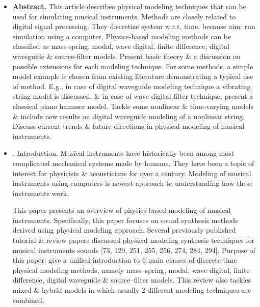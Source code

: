 \documentclass{article}
\begin{document}
\begin{itemize}
	\item {\bf Abstract.} This article describes physical modeling techniques that can be used for simulating musical instruments. Methods are closely related to digital signal processing. They discretize system w.r.t. time, because aim: run simulation using a computer. Physics-based modeling methods can be classified as mass-spring, modal, wave digital, finite difference, digital waveguide \& source-filter models. Present basic theory \& a discussion on possible extensions for each modeling technique. For some methods, a simple model example is chosen from existing literature demonstrating a typical use of method. E.g., in case of digital waveguide modeling technique a vibrating string model is discussed, \& in case of wave digital filter technique, present a classical piano hammer model. Tackle some nonlinear \& time-varying models \& include new results on digital waveguide modeling of a nonlinear string. Discuss current trends \& future directions in physical modeling of musical instruments.
	\item {. Introduction.} Musical instruments have historically been among most complicated mechanical systems made by humans. They have been a topic of interest for physicists \& acousticians for over a century. Modeling of musical instruments using computers is newest approach to understanding how these instruments work.
	
	This paper presents an overview of physics-based modeling of musical instruments. Specifically, this paper focuses on sound synthesis methods derived using physical modeling approach. Several previously published tutorial \& review papers discussed physical modeling synthesis techniques for musical instruments sounds [73, 129, 251, 255, 256, 274, 284, 294]. Purpose of this paper: give a unified introduction to 6 main classes of discrete-time physical modeling methods, namely mass--spring, modal, wave digital, finite difference, digital waveguide \& source--filter models. This review also tackles mixed \& hybrid models in which usually 2 different modeling techniques are combined.
	

\end{itemize}
\end{document}
